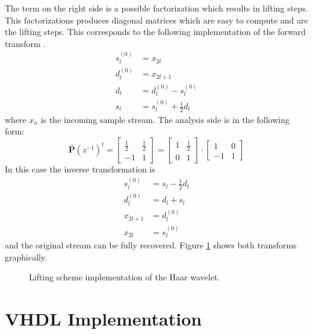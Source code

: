 \begin{refsection}
The term on the right side is a possible factorization which results in lifting steps.
This factorizations produces diagonal matrices which are easy to compute and are the lifting steps.
This corresponds to the following implementation of the forward transform \cite{fpga:Daubechies1998}.
\begin{equation}\label{fpga:equation:haar}
	\begin{aligned}
	s_l^{(0)} &= x_{2l} \\
	d_l^{(0)} &= x_{2l+1} \\ 
	d_l &= d_l^{(0)} - s_l^{(0)} \\
	s_l &= s_l^{(0)} + \frac{1}{2}d_l
	\end{aligned}
\end{equation}
where $x_{n}$ is the incoming sample stream.
The analysis side is in the following form:
\begin{equation*}
\bm {\bar P}(z^{-1})^t =
\begin{bmatrix}
\frac{1}{2} & \frac{1}{2} \\
-1 & 1
\end{bmatrix}
= 
\begin{bmatrix}
1 & \frac{1}{2} \\
0 & 1
\end{bmatrix}
\cdot
\begin{bmatrix}
1 & 0 \\
-1 & 1
\end{bmatrix}
\end{equation*}
In this case the inverse transformation is 
\begin{equation}\label{fpga:equation:inv_haar}
\begin{aligned}
s_l^{(0)} &= s_l - \frac{1}{2}d_l \\
d_l^{(0)} &= d_l + s_l \\ 
x_{2l+1}& =d_l^{(0)} \\
x_{2l} &= s_l^{(0)}
\end{aligned}
\end{equation}
and the original stream can be fully recovered.
Figure \ref{fpga:fig:liftingStepHaar} shows both transforms graphically.
\begin{figure}
	\centering
	
	\caption{Lifting scheme implementation of the Haar wavelet.}
	\label{fpga:fig:liftingStepHaar}
\end{figure}

\section{VHDL Implementation}


\end{refsection}
